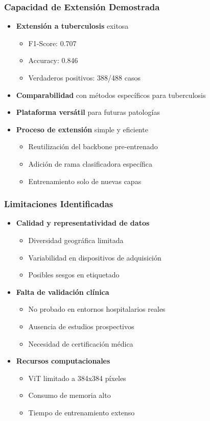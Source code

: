 \begin{frame}
\frametitle{Capacidad de Extensión Demostrada}
\begin{itemize}
    \item \textbf{Extensión a tuberculosis} exitosa
    \begin{itemize}
        \item F1-Score: 0.707
        \item Accuracy: 0.846
        \item Verdaderos positivos: 388/488 casos
    \end{itemize}
    \item \textbf{Comparabilidad} con métodos específicos para tuberculosis
    \item \textbf{Plataforma versátil} para futuras patologías
    \item \textbf{Proceso de extensión} simple y eficiente
    \begin{itemize}
        \item Reutilización del backbone pre-entrenado
        \item Adición de rama clasificadora específica
        \item Entrenamiento solo de nuevas capas
    \end{itemize}
\end{itemize}
\end{frame}


\begin{frame}
\frametitle{Limitaciones Identificadas}
\begin{itemize}
    \item \textbf{Calidad y representatividad de datos}
    \begin{itemize}
        \item Diversidad geográfica limitada
        \item Variabilidad en dispositivos de adquisición
        \item Posibles sesgos en etiquetado
    \end{itemize}
    \item \textbf{Falta de validación clínica}
    \begin{itemize}
        \item No probado en entornos hospitalarios reales
        \item Ausencia de estudios prospectivos
        \item Necesidad de certificación médica
    \end{itemize}
    \item \textbf{Recursos computacionales}
    \begin{itemize}
        \item ViT limitado a 384x384 píxeles
        \item Consumo de memoria alto
        \item Tiempo de entrenamiento extenso
    \end{itemize}
\end{itemize}
\end{frame}

